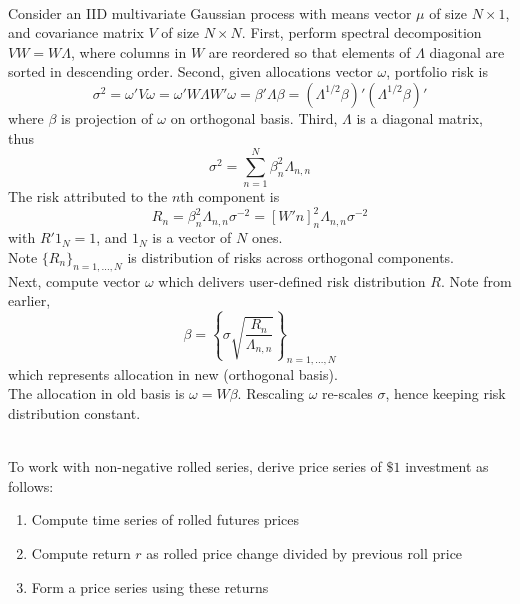 \begin{method} \\
Consider an IID multivariate Gaussian process with means vector $\mu$ of size $N \times 1$, and covariance matrix $V$ of size $N \times N$. First, perform spectral decomposition $VW = W \Lambda$, where columns in $W$ are reordered so that elements of $\Lambda$ diagonal are sorted in descending order. Second, given allocations vector $\omega$, portfolio risk is
\begin{equation}
\sigma^2 = \omega' V \omega = \omega' W \Lambda W' \omega = \beta' \Lambda \beta = (\Lambda^{1/2} \beta)' (\Lambda^{1/2} \beta)' \nonumber
\end{equation}
 where $\beta$ is projection of $\omega$ on orthogonal basis. Third, $\Lambda$ is a diagonal matrix, thus
\begin{equation}
\sigma^2 = \sum\limits_{n=1}^N \beta^2_n \Lambda_{n,n} \nonumber
\end{equation}
The risk attributed to the $n$th component is
\begin{equation}
R_n = \beta^2_n \Lambda_{n,n}\sigma^{-2} = [W' n]^2_n \Lambda_{n,n} \sigma^{-2} \nonumber
\end{equation}
with $R' 1_N = 1$, and $1_N$ is a vector of $N$ ones.\\
Note $\{R_n\}_{n=1, \ldots, N}$ is distribution of risks across orthogonal components.\\
Next, compute vector $\omega$ which delivers user-defined risk distribution $R$. Note from earlier,
\begin{equation}
\beta = \left\{ \sigma \sqrt{\frac{R_n}{\Lambda_{n,n}}} \right\}_{n = 1, \ldots, N} \nonumber
\end{equation}
which represents allocation in new (orthogonal basis).\\
The allocation in old basis is $\omega = W \beta$. Rescaling $\omega$ re-scales $\sigma$, hence keeping risk distribution constant.
\end{method}

\begin{method} \\
To work with non-negative rolled series, derive price series of $\$ 1$ investment as follows:
\begin{enumerate}[label=\roman*.]
\setlength{\itemsep}{0pt}
\item Compute time series of rolled futures prices
\item Compute return $r$ as rolled price change divided by previous roll price
\item Form a price series using these returns
\end{enumerate}
\end{method}

